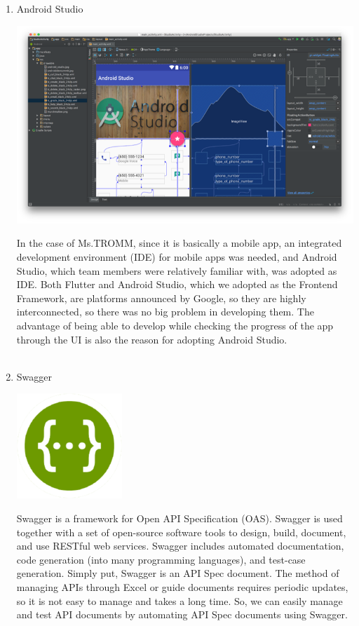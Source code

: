 \documentclass[conference]{IEEEtran}
\begin{document}
\begin{enumerate}
    \item Android Studio \\ 
\centerline{\includegraphics{as.png}}
    In the case of Ms.TROMM, since it is basically a mobile app, an integrated development environment (IDE) for mobile apps was needed, and Android Studio, which team members were relatively familiar with, was adopted as IDE. Both Flutter and Android Studio, which we adopted as the Frontend Framework, are platforms announced by Google, so they are highly interconnected, so there was no big problem in developing them. The advantage of being able to develop while checking the progress of the app through the UI is also the reason for adopting Android Studio. \\ \\
    \item Swagger \\ 
\centerline{\includegraphics{Swagger.png}}
    Swagger is a framework for Open API Specification (OAS). Swagger is used together with a set of open-source software tools to design, build, document, and use RESTful web services. Swagger includes automated documentation, code generation (into many programming languages), and test-case generation. Simply put, Swagger is an API Spec document. The method of managing APIs through Excel or guide documents requires periodic updates, so it is not easy to manage and takes a long time. So, we can easily manage and test API documents by automating API Spec documents using Swagger. \\ \\    

\end{enumerate}
\end{document}
